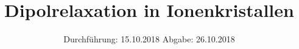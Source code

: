 

\subject{48}
\title{Dipolrelaxation in Ionenkristallen}
\date{
  Durchführung: 15.10.2018
  \hspace{3em}
  Abgabe: 26.10.2018
}



\maketitle
\thispagestyle{empty}
\tableofcontents
\newpage
\setcounter{page}{1}




\printbibliography
\appendix



